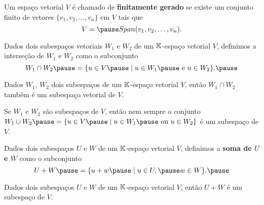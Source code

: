 \documentclass{beamer}
\begin{document}
\begin{frame}
  \begin{definicao}
    Um espaço vetorial $V$ é chamado de \textbf{finitamente gerado} \pause se existe um conjunto finito \pause de vetores $\{v_1, v_2, \dots, v_n\}$ em $V$ \pause tais que\pause
    \[
      V = \pause Span(v_1, v_2, \dots, v_n).
    \]
  \end{definicao}
\end{frame}

\begin{frame}
  \begin{definicao}
    Dados dois subespaços vetoriais $W_1$ \pause e $W_2$ \pause de um $\mathbb{K}$-espaço vetorial $V$, \pause definimos a interseção de $W_1$ e $W_2$ \pause como o subconjunto
    \[
      W_1 \cap W_2 \pause = \{u \in V \pause \mid u\in W_1\pause \mbox{ e } u \in W_2\}.\pause
    \]
  \end{definicao}

  \vspace{1cm}

  \begin{teorema}
    Dados $W_1$, $W_2$ dois subespaços de um $\mathbb{K}$-espaço vetorial $V$, \pause então $W_1 \cap W_2$ também é um subespaço vetorial de $V$.
  \end{teorema}
\end{frame}

\begin{frame}
  \begin{observacao}
    Se $W_1$ e $W_2$ são subespaços de $V$, \pause então nem sempre o conjunto $W_1 \cup W_2 \pause = \{u \in V \pause \mid u \in W_1 \pause \mbox{ ou } u \in W_2\}$ \pause é um subespaço de $V$.
  \end{observacao}
\end{frame}

\begin{frame}
  \begin{definicao}
    Dados dois subespaços $U$ e $W$ \pause de um $\mathbb{K}$-espaço vetorial $V$, \pause definimos a \textbf{soma de $U$ e $W$} \pause como o subconjunto
    \[
      U + W \pause = \{u + w \pause \mid u \in U, \pause w \in W\}.\pause
    \]
  \end{definicao}

  \vspace*{1cm}

  \begin{teorema}
    Dados dois subespaços $U$ e $W$ de um $\mathbb{K}$-espaço vetorial $V$, \pause então $U + W$ é um subespaço de $V$.
  \end{teorema}
\end{frame}
\end{document}
